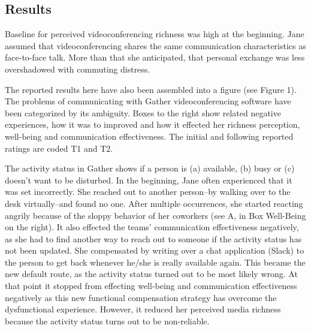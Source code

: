 \documentclass[man]{apa7}
\begin{document}
\subsection{Results}

Baseline for perceived videoconferencing richness was high at the beginning. Jane assumed that videoconferencing shares the same communication characteristics as face-to-face talk. More than that she anticipated, that personal exchange was less overshadowed with commuting distress.

The reported results here have also been assembled into a figure (see Figure 1). The problems of communicating with Gather videoconferencing software have been categorized by its ambiguity. Boxes to the right show related negative experiences, how it was to improved and how it effected her richness perception, well-being and communication effectiveness. The initial and following reported ratings are coded T1 and T2.

The activity status in Gather shows if a person is (a) available, (b) busy or (c) doesn't want to be disturbed. In the beginning, Jane often experienced that it was set incorrectly. She reached out to another person–by walking over to the desk virtually–and found no one. After multiple occurrences, she started reacting angrily because of the sloppy behavior of her coworkers (see A, in Box Well-Being on the right). It also effected the teams' communication effectiveness negatively, as she had to find another way to reach out to someone if the activity status has not been updated. She compensated by writing over a chat application (Slack) to the person to get back whenever he/she is really available again. This became the new default route, as the activity status turned out to be most likely wrong. At that point it stopped from effecting well-being and communication effectiveness negatively as this new functional compensation strategy has overcome the dysfunctional experience. However, it reduced her perceived media richness because the activity status turns out to be non-reliable. 
\end{document}
